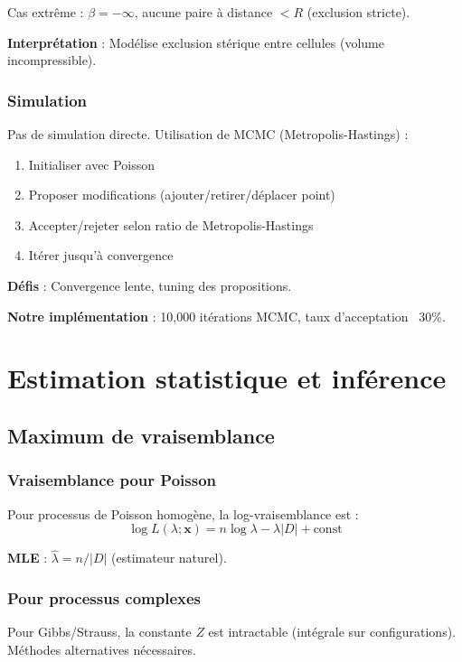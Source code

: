 Cas extrême : $\beta = -\infty$, aucune paire à distance $< R$ (exclusion stricte).

\textbf{Interprétation} : Modélise exclusion stérique entre cellules (volume incompressible).

\subsubsection{Simulation}

Pas de simulation directe. Utilisation de MCMC (Metropolis-Hastings) :
\begin{enumerate}
    \item Initialiser avec Poisson
    \item Proposer modifications (ajouter/retirer/déplacer point)
    \item Accepter/rejeter selon ratio de Metropolis-Hastings
    \item Itérer jusqu'à convergence
\end{enumerate}

\textbf{Défis} : Convergence lente, tuning des propositions.

\textbf{Notre implémentation} : 10,000 itérations MCMC, taux d'acceptation ~30\%.

\section{Estimation statistique et inférence}

\subsection{Maximum de vraisemblance}

\subsubsection{Vraisemblance pour Poisson}

Pour processus de Poisson homogène, la log-vraisemblance est :
\[
\log L(\lambda ; \mathbf{x}) = n \log \lambda - \lambda |D| + \text{const}
\]

\textbf{MLE} : $\hat{\lambda} = n / |D|$ (estimateur naturel).

\subsubsection{Pour processus complexes}

Pour Gibbs/Strauss, la constante $Z$ est intractable (intégrale sur configurations). Méthodes alternatives nécessaires.

